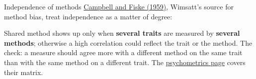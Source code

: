\documentclass[aspectratio=169,11pt]{beamer}
\begin{document}
\begin{frame}[label=cf]{Independence of methods}
\href{https://www.ovid.com/journals/plbul/fulltext/00006823-195903000-00001~convergent-and-discriminant-validation-by-the}{Campbell and Fiske (1959)}, Wimsatt's source for method bias, treat independence as a matter of degree:

\vspace{0.3em}
\begin{center}
\end{center}

\vspace{0.2em}
{\small Shared method shows up only when \textbf{several traits} are measured by \textbf{several methods}; otherwise a high correlation could reflect the trait or the method. The check: a measure should agree more with a different method on the same trait than with the same method on a different trait. The \href{https://measuring-self-reports.github.io/measuring-self-reports/foundations/psychometrics/}{psychometrics page} covers their matrix.}
\end{frame}
\end{document}

